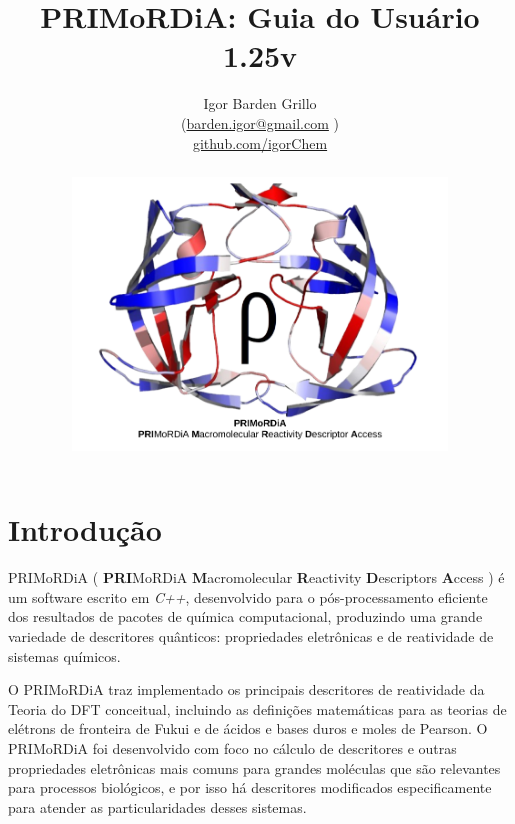 \documentclass[a4paper,11pt]{refart}
\title{PRIMoRDiA: Guia do Usuário 1.25v  }
\author{Igor Barden Grillo \\(\url{barden.igor@gmail.com} )\\\url{github.com/igorChem}}
\begin{document}
\maketitle

\begin{abstract}
\hspace*{-1.4\leftmarginwidth}
\begin{minipage}{\fullwidth}
\begin{figure}[H]
	\begin{center}
	\includegraphics[width=7in]{logo_primordia}
\end{center}
\end{figure}

\end{minipage}

\end{abstract}
\newpage
\tableofcontents
\newpage

\section{Introdução}

PRIMoRDiA ( \textbf{PRI}MoRDiA \textbf{M}acromolecular \textbf{R}eactivity \textbf{D}escriptors \textbf{A}ccess ) é um software escrito em \emph{C++}, desenvolvido para o pós-processamento eficiente dos resultados de pacotes de química computacional, produzindo uma grande variedade de descritores quânticos: propriedades eletrônicas e de reatividade de sistemas químicos. 

O PRIMoRDiA traz implementado os principais descritores de reatividade da Teoria do DFT conceitual, incluindo as definições matemáticas para as teorias de elétrons de fronteira de Fukui e de ácidos e bases duros e moles de Pearson. O PRIMoRDiA foi desenvolvido com foco no cálculo de descritores e outras propriedades eletrônicas mais comuns para grandes moléculas que são relevantes para processos biológicos, e por isso há descritores modificados especificamente para atender as particularidades desses sistemas. 
\end{document}
